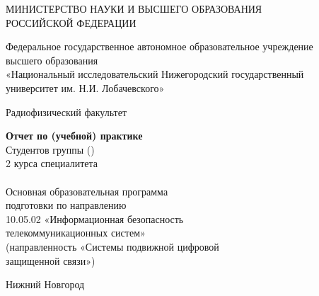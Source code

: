 \begin{titlepage}
	\centering

	МИНИСТЕРСТВО НАУКИ И ВЫСШЕГО ОБРАЗОВАНИЯ \\
	РОССИЙСКОЙ ФЕДЕРАЦИИ

	\vspace{1em}
	Федеральное государственное автономное образовательное учреждение \\
	высшего образования \\
	«Национальный исследовательский Нижегородский государственный \\
	университет им. Н.И. Лобачевского»

	\vspace{1em}
	Радиофизический факультет

	\vfill
	\begin{minipage}{0.8\linewidth}
		\centering\large\bfseries\MakeUppercase{\labtheme}
	\end{minipage}

	\vfill
	\begin{flushright}
		\begin{minipage}{0.5\textwidth}
			\raggedright
			{\bfseries Отчет по (учебной) практике}\\
			Студентов группы \labgroupshort (\labgroupfull)\\
			2 курса специалитета\\
			\labauthors \\
			\vspace{1em}
			Основная образовательная программа\\
			подготовки по направлению\\
			10.05.02 «Информационная безопасность\\
			телекоммуникационных систем»\\
			(направленность «Системы подвижной цифровой\\
			защищенной связи»)
		\end{minipage}
	\end{flushright}

	\vfill
	Нижний Новгород \the\year{}
\end{titlepage}
